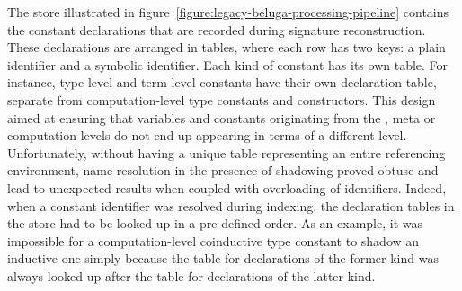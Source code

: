 The store illustrated in figure~\ref{figure:legacy-beluga-processing-pipeline} contains the constant declarations that are recorded during signature reconstruction.
These declarations are arranged in tables, where each row has two keys: a plain identifier and a symbolic identifier.
Each kind of constant has its own table.
For instance, \LF type-level and term-level constants have their own declaration table, separate from computation-level type constants and constructors.
This design aimed at ensuring that variables and constants originating from the \LF, meta or computation levels do not end up appearing in terms of a different level.
Unfortunately, without having a unique table representing an entire referencing environment, name resolution in the presence of shadowing proved obtuse and lead to unexpected results when coupled with overloading of identifiers.
Indeed, when a constant identifier was resolved during indexing, the declaration tables in the store had to be looked up in a pre-defined order.
As an example, it was impossible for a computation-level coinductive type constant to shadow an inductive one simply because the table for declarations of the former kind was always looked up after the table for declarations of the latter kind.







\newcommand{\private}[1]{#1_\downarrow}
\newcommand{\public}[1]{#1_\uparrow}
\newcommand{\Private}[1]{#1_\Downarrow}
\newcommand{\Public}[1]{#1_\Uparrow}

